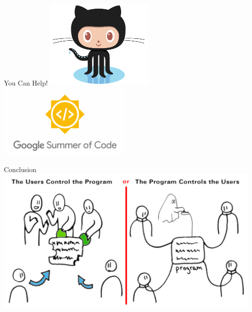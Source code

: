 \documentclass[pdf]{beamer}
\begin{document}
\begin{frame}{You Can Help!}
  \hfill
  \includegraphics[width=0.4\textwidth]{Octocat.png}
  \hfill\pause
  \includegraphics[width=0.5\textwidth]{GSoC.png}
\end{frame}

\begin{frame}{Conclusion}
  \includegraphics[width=\textwidth]{conclude.png}
\end{frame}
\end{document}
